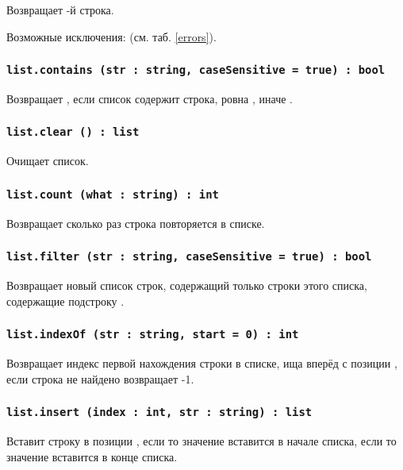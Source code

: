 Возвращает -й строка.

Возможные исключения:  (см. таб. \ref{errors}).

\subsubsection{\lstinline|list.contains (str : string, caseSensitive = true) : bool|}

Возвращает \true, если список содержит строка, ровна , иначе \false.

\subsubsection{\lstinline|list.clear () : list|}

Очищает список.

\subsubsection{\lstinline|list.count (what : string) : int|}

Возвращает сколько раз строка  повторяется в списке.

\subsubsection{\lstinline|list.filter (str : string, caseSensitive = true) : bool|}

Возвращает новый список строк, содержащий только строки этого списка, содержащие подстроку . 

\subsubsection{\lstinline|list.indexOf (str : string, start = 0) : int|}

Возвращает индекс первой нахождения строки  в списке, ища вперёд с позиции , если строка не найдено возвращает -1.

\subsubsection{\lstinline|list.insert (index : int, str : string) : list|}

Вставит строку  в позиции , если  то значение вставится в начале списка, если  то значение вставится в конце списка.

